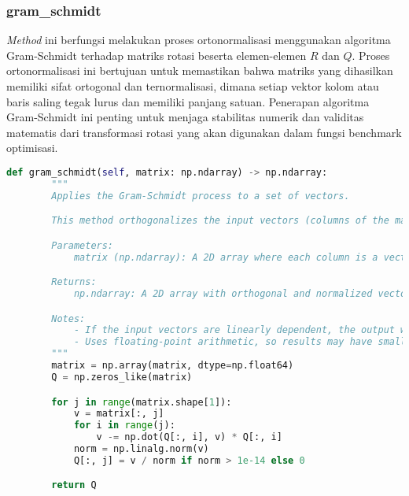 \subsubsection{gram\_schmidt}
\textit{Method} ini berfungsi melakukan proses ortonormalisasi menggunakan algoritma Gram-Schmidt terhadap matriks rotasi beserta elemen-elemen $R$ dan $Q$. Proses ortonormalisasi ini bertujuan untuk memastikan bahwa matriks yang dihasilkan memiliki sifat ortogonal dan ternormalisasi, dimana setiap vektor kolom atau baris saling tegak lurus dan memiliki panjang satuan. Penerapan algoritma Gram-Schmidt ini penting untuk menjaga stabilitas numerik dan validitas matematis dari transformasi rotasi yang akan digunakan dalam fungsi benchmark optimisasi.
\begin{lstlisting}[language=Python, caption=\textit{method} untuk menerapkan penalti pada elemen input, label=lst:init_cec]
    def gram_schmidt(self, matrix: np.ndarray) -> np.ndarray:
        """
        Applies the Gram-Schmidt process to a set of vectors.

        This method orthogonalizes the input vectors (columns of the matrix) and normalizes them to unit length.

        Parameters:
            matrix (np.ndarray): A 2D array where each column is a vector.

        Returns:
            np.ndarray: A 2D array with orthogonal and normalized vectors as columns.

        Notes:
            - If the input vectors are linearly dependent, the output will contain zero vectors for dependent columns.
            - Uses floating-point arithmetic, so results may have small numerical errors.
        """
        matrix = np.array(matrix, dtype=np.float64)
        Q = np.zeros_like(matrix)

        for j in range(matrix.shape[1]):
            v = matrix[:, j]
            for i in range(j):
                v -= np.dot(Q[:, i], v) * Q[:, i]
            norm = np.linalg.norm(v)
            Q[:, j] = v / norm if norm > 1e-14 else 0

        return Q
\end{lstlisting}
